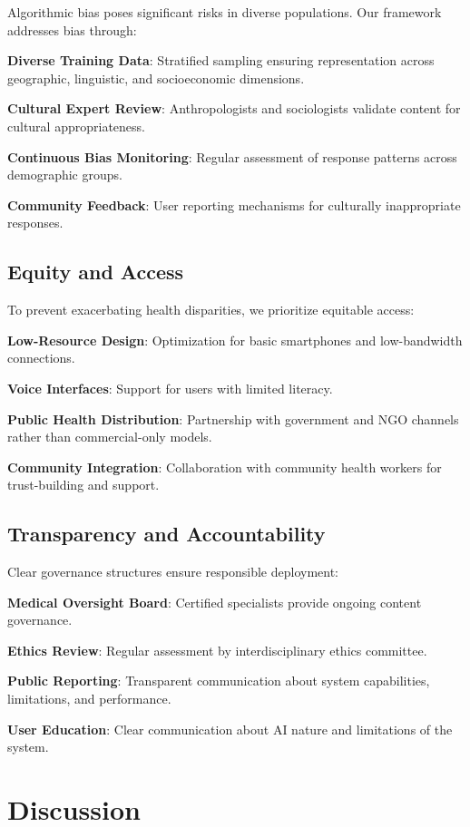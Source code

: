 \documentclass[letterpaper]{article} %
\begin{document}
Algorithmic bias poses significant risks in diverse populations. Our framework addresses bias through:

\textbf{Diverse Training Data}: Stratified sampling ensuring representation across geographic, linguistic, and socioeconomic dimensions.

\textbf{Cultural Expert Review}: Anthropologists and sociologists validate content for cultural appropriateness.

\textbf{Continuous Bias Monitoring}: Regular assessment of response patterns across demographic groups.

\textbf{Community Feedback}: User reporting mechanisms for culturally inappropriate responses.

\subsection{Equity and Access}

To prevent exacerbating health disparities, we prioritize equitable access:

\textbf{Low-Resource Design}: Optimization for basic smartphones and low-bandwidth connections.

\textbf{Voice Interfaces}: Support for users with limited literacy.

\textbf{Public Health Distribution}: Partnership with government and NGO channels rather than commercial-only models.

\textbf{Community Integration}: Collaboration with community health workers for trust-building and support.

\subsection{Transparency and Accountability}

Clear governance structures ensure responsible deployment:

\textbf{Medical Oversight Board}: Certified specialists provide ongoing content governance.

\textbf{Ethics Review}: Regular assessment by interdisciplinary ethics committee.

\textbf{Public Reporting}: Transparent communication about system capabilities, limitations, and performance.

\textbf{User Education}: Clear communication about AI nature and limitations of the system.

\section{Discussion}
\end{document}
